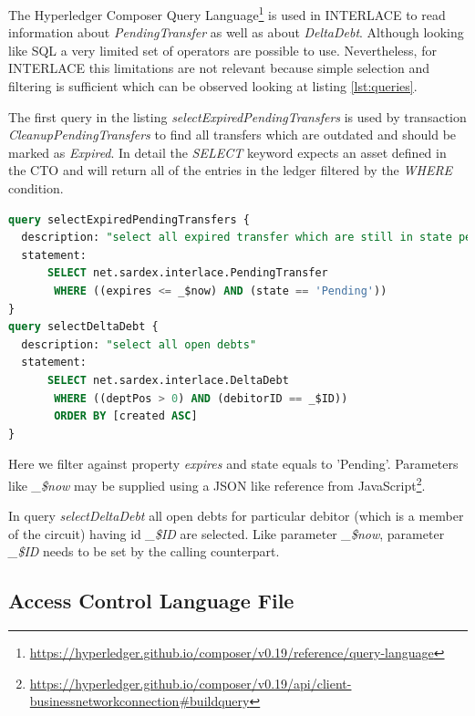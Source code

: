 The Hyperledger Composer Query Language\footnote{\url{https://hyperledger.github.io/composer/v0.19/reference/query-language}} is used in INTERLACE to read information about \textit{PendingTransfer} as well as about \textit{DeltaDebt}. Although looking like SQL a very limited set of operators are possible to use. Nevertheless, for INTERLACE this limitations are not relevant because simple selection and filtering is sufficient which can be observed looking at listing \ref{lst:queries}.

The first query in the listing \textit{selectExpiredPendingTransfers} is used by transaction \textit{CleanupPendingTransfers} to find all transfers which are outdated and should be marked as \textit{Expired}. In detail the \textit{SELECT} keyword expects an asset defined in the CTO and will return all of the entries in the ledger filtered by the \textit{WHERE} condition.

\begin{center}
\begin{minipage}{0.8\textwidth}
\small
\begin{lstlisting}[language=sql,firstnumber=1,caption={\bf\small INTERLACE business network queries}, captionpos=b,label=lst:queries]
query selectExpiredPendingTransfers {
  description: "select all expired transfer which are still in state pending"
  statement:
      SELECT net.sardex.interlace.PendingTransfer
       WHERE ((expires <= _$now) AND (state == 'Pending'))
}
query selectDeltaDebt {
  description: "select all open debts"
  statement:
      SELECT net.sardex.interlace.DeltaDebt
       WHERE ((deptPos > 0) AND (debitorID == _$ID))
       ORDER BY [created ASC]
}
\end{lstlisting}
\end{minipage}
\end{center}

Here we filter against property \textit{expires} and state equals to 'Pending'. Parameters like \textit{\_\$now} may be supplied using a JSON like reference from JavaScript\footnote{\url{https://hyperledger.github.io/composer/v0.19/api/client-businessnetworkconnection\#buildquery}}.

In query \textit{selectDeltaDebt} all open debts for particular debitor (which is a member of the circuit) having id \textit{\_\$ID} are selected. Like parameter \textit{\_\$now}, parameter \textit{\_\$ID} needs to be set by the calling counterpart.

\subsection{Access Control Language File}

